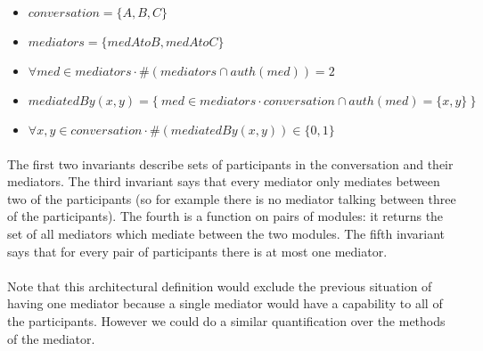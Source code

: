 \documentclass{article}
\begin{document}
\begin{itemize}
	\item $conversation = \{A, B, C\}$
	\item $mediators = \{medAtoB, medAtoC\}$
	\item $\forall med \in mediators \cdot \# (mediators \cap auth(med)) = 2$
	\item $mediatedBy(x,y) = \{~med \in mediators \cdot conversation \cap auth(med) = \{x, y\}~\}$
	\item $\forall x, y \in conversation \cdot \#(mediatedBy(x,y)) \in \{0, 1\}$
\end{itemize}

\paragraph{}
The first two invariants describe sets of participants in the conversation and their mediators. The third invariant says that every mediator only mediates between two of the participants (so for example there is no mediator talking between three of the participants). The fourth is a function on pairs of modules: it returns the set of all mediators which mediate between the two modules. The fifth invariant says that for every pair of participants there is at most one mediator.

\paragraph{}
Note that this architectural definition would exclude the previous situation of having one mediator because a single mediator would have a capability to all of the participants. However we could do a similar quantification over the methods of the mediator.
\end{document}
